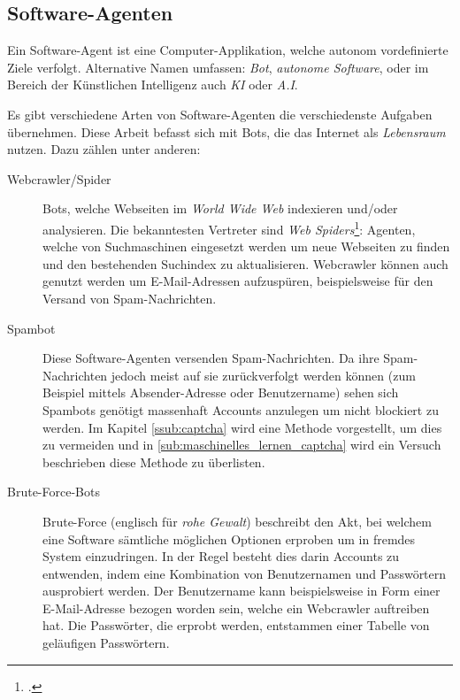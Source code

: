 \subsection{Software-Agenten} %
\label{sub:software_agenten}
Ein Software-Agent ist eine Computer-Applikation, welche autonom vordefinierte
Ziele verfolgt. Alternative Namen umfassen: \emph{Bot}, \emph{autonome
Software}, oder im Bereich der Künstlichen Intelligenz auch \emph{KI} oder
\emph{A.I}.

Es gibt verschiedene Arten von Software-Agenten die verschiedenste Aufgaben
übernehmen. Diese Arbeit befasst sich mit Bots, die das Internet als
\emph{Lebensraum} nutzen. Dazu zählen unter anderen:

\begin{description}
  \item[Webcrawler/Spider]
  Bots, welche Webseiten im \emph{World Wide Web} indexieren und/oder
  analysieren. Die bekanntesten Vertreter sind \emph{Web
  Spiders}\footcite{wa:tkWWWRobot}: Agenten, welche von Suchmaschinen eingesetzt
  werden um neue Webseiten zu finden und den bestehenden Suchindex zu
  aktualisieren. Webcrawler können auch genutzt werden um E-Mail-Adressen
  aufzuspüren, beispielsweise für den Versand von Spam-Nachrichten.
  
  \item[Spambot]
  Diese Software-Agenten versenden Spam-Nachrichten. Da ihre Spam-Nachrichten
  jedoch meist auf sie zurückverfolgt werden können (zum Beispiel mittels
  Absender-Adresse oder Benutzername) sehen sich Spambots genötigt massenhaft
  Accounts anzulegen um nicht blockiert zu werden. Im Kapitel
  \ref{ssub:captcha} wird eine Methode vorgestellt, um dies zu vermeiden und in
  \ref{sub:maschinelles_lernen_captcha} wird ein Versuch beschrieben diese
  Methode zu überlisten.
  
  \item[Brute-Force-Bots]
  Brute-Force (englisch für \emph{rohe Gewalt}) beschreibt den Akt, bei welchem
  eine Software sämtliche möglichen Optionen erproben um in fremdes System
  einzudringen. In der Regel besteht dies darin Accounts zu entwenden, indem
  eine Kombination von Benutzernamen und Passwörtern ausprobiert werden. Der
  Benutzername kann beispielsweise in Form einer E-Mail-Adresse bezogen worden
  sein, welche ein Webcrawler auftreiben hat. Die Passwörter, die erprobt
  werden, entstammen einer Tabelle von geläufigen Passwörtern.
\end{description}
